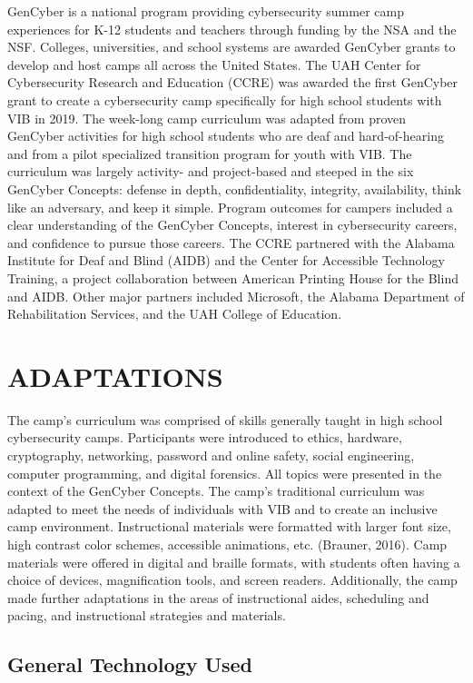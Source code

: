 \documentclass[11.5pt]{sig-alternate} %
\begin{document}
\begin{large}
GenCyber is a national program providing cybersecurity summer camp experiences for K-12 students and teachers through funding by the NSA and the NSF. Colleges, universities, and school systems are awarded GenCyber grants to develop and host camps all across the United States. The UAH Center for Cybersecurity Research and Education (CCRE) was awarded the first GenCyber grant to create a cybersecurity camp specifically for high school students with VIB in 2019. The week-long camp curriculum was adapted from proven GenCyber activities for high school students who are deaf and hard-of-hearing and from a pilot specialized transition program for youth with VIB. The curriculum was largely activity- and project-based and steeped in the six GenCyber Concepts: defense in depth, confidentiality, integrity, availability, think like an adversary, and keep it simple. Program outcomes for campers included a clear understanding of the GenCyber Concepts, interest in cybersecurity careers, and confidence to pursue those careers. The CCRE partnered with the Alabama Institute for Deaf and Blind (AIDB) and the Center for Accessible Technology Training, a project collaboration between American Printing House for the Blind and AIDB. Other major partners included Microsoft, the Alabama Department of Rehabilitation Services, and the UAH College of Education.

\section*{ADAPTATIONS}

The camp’s curriculum was comprised of skills generally taught in high school cybersecurity camps. Participants were introduced to ethics, hardware, cryptography, networking, password and online safety, social engineering, computer programming, and digital forensics. All topics were presented in the context of the GenCyber Concepts. The camp’s traditional curriculum was adapted to meet the needs of individuals with VIB and to create an inclusive camp environment. Instructional materials were formatted with larger font size, high contrast color schemes, accessible animations, etc. (Brauner, 2016). Camp materials were offered in digital and braille formats, with students often having a choice of devices, magnification tools, and screen readers. Additionally, the camp made further adaptations in the areas of instructional aides, scheduling and pacing, and instructional strategies and materials.

\subsection*{General Technology Used}


\end{large}
\end{document}
